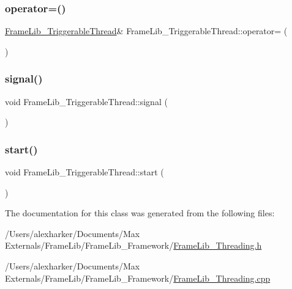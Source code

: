 \subsubsection{\texorpdfstring{operator=()}{operator=()}}
{\footnotesize\ttfamily \hyperlink{class_frame_lib___triggerable_thread}{Frame\+Lib\+\_\+\+Triggerable\+Thread}\& Frame\+Lib\+\_\+\+Triggerable\+Thread\+::operator= (\begin{DoxyParamCaption}\item[{const \hyperlink{class_frame_lib___triggerable_thread}{Frame\+Lib\+\_\+\+Triggerable\+Thread} \&}]{ }\end{DoxyParamCaption})\hspace{0.3cm}{\ttfamily [delete]}}

\mbox{\label{class_frame_lib___triggerable_thread_a7120d3757c35e62777eb1c20fea6f93f}} 
\subsubsection{\texorpdfstring{signal()}{signal()}}
{\footnotesize\ttfamily void Frame\+Lib\+\_\+\+Triggerable\+Thread\+::signal (\begin{DoxyParamCaption}{ }\end{DoxyParamCaption})\hspace{0.3cm}{\ttfamily [inline]}}

\mbox{\label{class_frame_lib___triggerable_thread_a69f8246eb1ad71c06b58e270de4e3107}} 
\subsubsection{\texorpdfstring{start()}{start()}}
{\footnotesize\ttfamily void Frame\+Lib\+\_\+\+Triggerable\+Thread\+::start (\begin{DoxyParamCaption}{ }\end{DoxyParamCaption})\hspace{0.3cm}{\ttfamily [inline]}}



The documentation for this class was generated from the following files\+:\begin{DoxyCompactItemize}
\item 
/\+Users/alexharker/\+Documents/\+Max Externals/\+Frame\+Lib/\+Frame\+Lib\+\_\+\+Framework/\hyperlink{_frame_lib___threading_8h}{Frame\+Lib\+\_\+\+Threading.\+h}\item 
/\+Users/alexharker/\+Documents/\+Max Externals/\+Frame\+Lib/\+Frame\+Lib\+\_\+\+Framework/\hyperlink{_frame_lib___threading_8cpp}{Frame\+Lib\+\_\+\+Threading.\+cpp}\end{DoxyCompactItemize}

